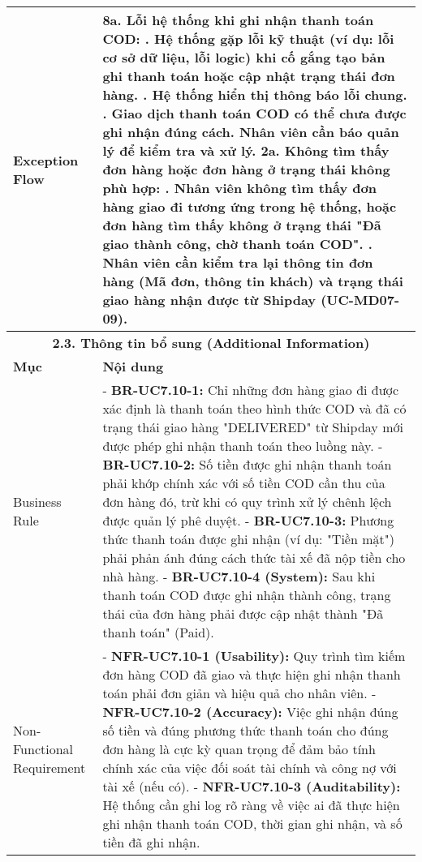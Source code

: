 \begin{longtable}{|m{4cm}|p{11cm}|}
\hline
Exception Flow & \textbf{8a. Lỗi hệ thống khi ghi nhận thanh toán COD:} \newline    1. Hệ thống gặp lỗi kỹ thuật (ví dụ: lỗi cơ sở dữ liệu, lỗi logic) khi cố gắng tạo bản ghi thanh toán hoặc cập nhật trạng thái đơn hàng. \newline    2. Hệ thống hiển thị thông báo lỗi chung. \newline    3. Giao dịch thanh toán COD có thể chưa được ghi nhận đúng cách. Nhân viên cần báo quản lý để kiểm tra và xử lý. \newline \textbf{2a. Không tìm thấy đơn hàng hoặc đơn hàng ở trạng thái không phù hợp:} \newline    1. Nhân viên không tìm thấy đơn hàng giao đi tương ứng trong hệ thống, hoặc đơn hàng tìm thấy không ở trạng thái "Đã giao thành công, chờ thanh toán COD". \newline    2. Nhân viên cần kiểm tra lại thông tin đơn hàng (Mã đơn, thông tin khách) và trạng thái giao hàng nhận được từ Shipday (UC-MD07-09). \\
\hline
\multicolumn{2}{|c|}{\textbf{2.3. Thông tin bổ sung (Additional Information)}} \\
\hline
\textbf{Mục} & \textbf{Nội dung} \\
\hline
Business Rule & - \textbf{BR-UC7.10-1:} Chỉ những đơn hàng giao đi được xác định là thanh toán theo hình thức COD và đã có trạng thái giao hàng "DELIVERED" từ Shipday mới được phép ghi nhận thanh toán theo luồng này. \newline - \textbf{BR-UC7.10-2:} Số tiền được ghi nhận thanh toán phải khớp chính xác với số tiền COD cần thu của đơn hàng đó, trừ khi có quy trình xử lý chênh lệch được quản lý phê duyệt. \newline - \textbf{BR-UC7.10-3:} Phương thức thanh toán được ghi nhận (ví dụ: "Tiền mặt") phải phản ánh đúng cách thức tài xế đã nộp tiền cho nhà hàng. \newline - \textbf{BR-UC7.10-4 (System):} Sau khi thanh toán COD được ghi nhận thành công, trạng thái của đơn hàng phải được cập nhật thành "Đã thanh toán" (Paid). \\
\hline
Non-Functional Requirement & - \textbf{NFR-UC7.10-1 (Usability):} Quy trình tìm kiếm đơn hàng COD đã giao và thực hiện ghi nhận thanh toán phải đơn giản và hiệu quả cho nhân viên. \newline - \textbf{NFR-UC7.10-2 (Accuracy):} Việc ghi nhận đúng số tiền và đúng phương thức thanh toán cho đúng đơn hàng là cực kỳ quan trọng để đảm bảo tính chính xác của việc đối soát tài chính và công nợ với tài xế (nếu có). \newline - \textbf{NFR-UC7.10-3 (Auditability):} Hệ thống cần ghi log rõ ràng về việc ai đã thực hiện ghi nhận thanh toán COD, thời gian ghi nhận, và số tiền đã ghi nhận. \\
\hline
\end{longtable}

